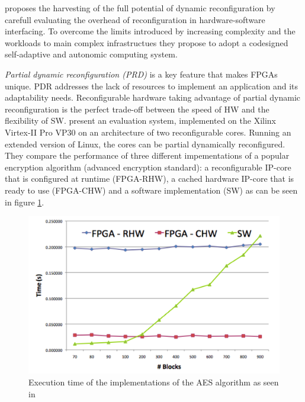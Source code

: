 \cite{reconfigurable} proposes the harvesting of the full potential of dynamic reconfiguration by carefull evaluating the overhead of reconfiguration in hardware-software interfacing. To overcome the limits introduced by increasing complexity and the workloads to main complex infrastructues they propose to adopt a codesigned self-adaptive and autonomic computing system. 

\emph{Partial dynamic reconfiguration (PRD)} is a key feature that makes FPGAs unique. PDR addresses the lack of resources to implement an application and its adaptability needs. Reconfigurable hardware taking advantage of partial dynamic reconfiguration is the perfect trade-off between the speed of HW and the flexibility of SW. \cite{reconfigurable} present an evaluation system, implemented on the Xilinx Virtex-II Pro VP30 on an architecture of two reconfigurable cores. Running an extended version of Linux, the cores can be partial dynamically reconfigured. They compare the performance of three different impementations of a popular encryption algorithm (advanced encryption standard): a reconfigurable IP-core that is configured at runtime (FPGA-RHW), a cached hardware IP-core that is ready to use (FPGA-CHW) and a software implementation (SW) as can be seen in figure \ref{fig:reconfig}. 
\begin{figure}[htb]%
\includegraphics[width=\columnwidth]{Pictures/reconfig.png}%
\caption{Execution time of the implementations of the AES algorithm as seen in \cite{reconfigurable}}%
\label{fig:reconfig}%
\end{figure} 
